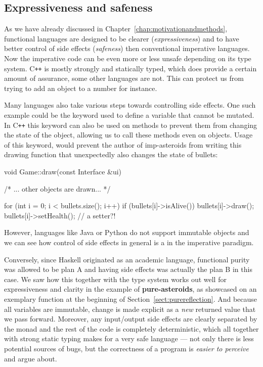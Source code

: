 \documentclass[
  digital, %
  color,   %
  table,   %
  oneside, %
  lof,     %
  lot,     %
]{fithesis3}
\newcommand{\cpp}{C\nolinebreak\texttt{+}\nolinebreak\texttt{+}}
\begin{document}
{\subsection{Expressiveness and safeness}

As we have already discussed in Chapter~\ref{chap:motivationandmethods},
functional languages are designed to be clearer (\emph{expressiveness})
and to have better control of side effects (\emph{safeness}) then conventional
imperative languages. Now the imperative code can be even more or less unsafe
depending on its type system. \cpp{} is mostly strongly and statically typed, which
does provide a certain amount of assurance, some other languages are not.
This can protect us from trying to add an object to a number for instance.

Many languages also take various steps towards controlling side effects.
One such example could be the  keyword used to define a variable
that cannot be mutated. In \cpp{} this keyword can also be used on methods
to prevent them from changing the state of the object, allowing us to call these
methods even on  objects. Usage of this keyword, would prevent
the author of imp-asteroids from writing this drawing function that
unexpectedly also changes the state of bullets:
\begin{cppblock}
void Game::draw(const Interface &ui) {

    /* ... other objects are drawn... */
    
    for (int i = 0; i < bullets.size(); i++) {
        if (bullets[i]->isAlive()) {
            bullets[i]->draw();
            bullets[i]->setHealth(); // a setter?!
        }
    }
}
\end{cppblock}
However, languages like Java or Python do not support immutable objects
and we can see how control of side effects in general is a  in the imperative paradigm.

Conversely, since Haskell originated as an academic language,
functional purity was allowed to be plan A and having
side effects was actually the plan B in this case.
We saw how this together with the type system works out well for expressiveness and clarity
in the example of \textbf{pure-asteroids}, as showcased on an exemplary function
at the beginning of Section~\ref{sect:purereflection}.
And because all variables are immutable, change is made explicit as a \emph{new} returned value
that we pass forward.
Moreover, any input/output side effects are clearly separated by the  monad
and the rest of the code is completely deterministic, which all together with strong static typing
makes for a very safe language --- not only there is less potential sources of bugs, but the
correctness of a program is \emph{easier to perceive} and argue about.

}
\end{document}
